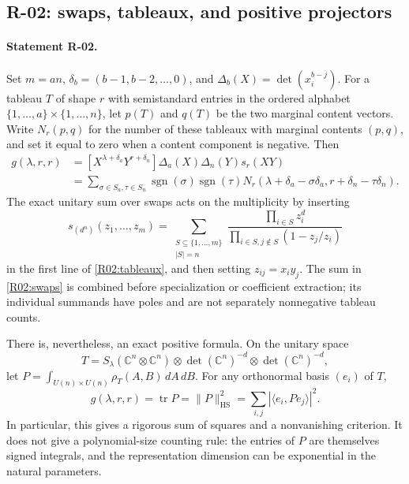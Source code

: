 \documentclass[11pt,a4paper]{article}
\theoremstyle{definition}\newtheorem{definition}{Definition}
\begin{document}
\subsection{R-02: swaps, tableaux, and positive projectors}

\paragraph{Statement R-02.}
Set $m=an$, $\delta_b=(b-1,b-2,\ldots,0)$, and
$\Delta_b(X)=\det(x_i^{b-j})$. For a tableau $T$ of shape $r$ with
semistandard entries in the ordered alphabet $\{1,\ldots,a\}\times
\{1,\ldots,n\}$, let $p(T)$ and $q(T)$ be the two marginal content vectors.
Write $N_r(p,q)$ for the number of these tableaux with marginal contents
$(p,q)$, and set it equal to zero when a content component is negative.
Then
\begin{align}\label{R02:tableaux}
 g(\lambda,r,r)
 &= [X^{\lambda+\delta_a}Y^{r+\delta_n}]
       \Delta_a(X)\Delta_n(Y)s_r(XY)\\
 &=\sum_{\sigma\in S_a,\tau\in S_n}
    \operatorname{sgn}(\sigma)\operatorname{sgn}(\tau)
    N_r(\lambda+\delta_a-\sigma\delta_a,
        r+\delta_n-\tau\delta_n).\nonumber
\end{align}
The exact unitary sum over swaps acts on the multiplicity by inserting
\begin{equation}\label{R02:swaps}
 s_{(d^n)}(z_1,\ldots,z_m)=
 \sum_{\substack{S\subseteq\{1,\ldots,m\}\\|S|=n}}
 \frac{\prod_{i\in S}z_i^d}
      {\prod_{i\in S,j\notin S}(1-z_j/z_i)}
\end{equation}
in the first line of \eqref{R02:tableaux}, and then setting $z_{ij}=x_i y_j$.
The sum in \eqref{R02:swaps} is combined before specialization or coefficient
extraction; its individual summands have poles and are not separately
nonnegative tableau counts.

There is, nevertheless, an exact positive formula. On the unitary space
\[
 T=S_\lambda(\mathbb C^n\otimes\mathbb C^n)
       \otimes\det(\mathbb C^n)^{-d}\otimes\det(\mathbb C^n)^{-d},
\]
let $P=\int_{U(n)\times U(n)}\rho_T(A,B)\,dA\,dB$. For any orthonormal
basis $(e_i)$ of $T$,
\begin{equation}\label{R02:projector}
 g(\lambda,r,r)=\operatorname{tr}P
   =\|P\|_{\mathrm{HS}}^2=\sum_{i,j}|\langle e_i,Pe_j\rangle|^2.
\end{equation}
In particular, this gives a rigorous sum of squares and a nonvanishing
criterion. It does not give a polynomial-size counting rule: the entries
of $P$ are themselves signed integrals, and the representation dimension
can be exponential in the natural parameters.
\end{document}
